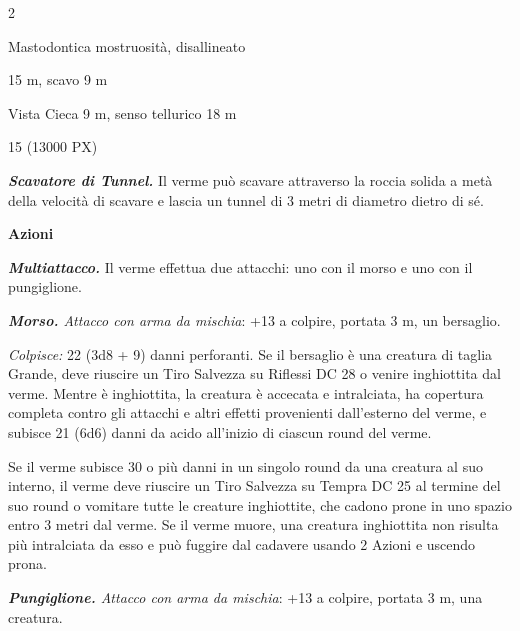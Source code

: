 \begin{multicols}{2}
{
\begin{description}[noitemsep, topsep=0pt, parsep=0pt, partopsep=0pt, itemsep=1pt, leftmargin=2.35cm,  labelwidth=2.2cm, itemindent=0cm, listparindent=0pt] %
\setlength{\baselineskip}{10pt}
\item[\textbf{Taglia/Tipo}] Mastodontica mostruosità, disallineato
\item[\textbf{Caratt.}] 
\item[\textbf{Punti Ferita}] 
\item[\textbf{Movimento}] 15 m, scavo 9 m
\item[\textbf{Tiri Salvez.}] 
\item[\textbf{Sensi}] Vista Cieca 9 m, senso tellurico 18 m
\item[\textbf{Sfida}] 15 (13000 PX)
\end{description}
\smallskip

\emph{\textbf{Scavatore di Tunnel.}} Il verme può scavare attraverso la roccia solida a metà della velocità di scavare e lascia un tunnel di 3 metri di diametro dietro di sé.

\textbf{Azioni}

\emph{\textbf{Multiattacco.}} Il verme effettua due attacchi: uno con il morso e uno con il pungiglione.

\emph{\textbf{Morso.} Attacco con arma da mischia}: +13 a colpire, portata 3 m, un bersaglio.

\emph{Colpisce:} 22 (3d8 + 9) danni perforanti. Se il bersaglio è una creatura di taglia Grande, deve riuscire un Tiro Salvezza su Riflessi DC 28 o venire inghiottita dal verme. Mentre è inghiottita, la creatura è accecata e intralciata, ha copertura completa contro gli attacchi e altri effetti provenienti dall'esterno del verme, e subisce 21 (6d6) danni da acido all'inizio di ciascun round del verme.

Se il verme subisce 30 o più danni in un singolo round da una creatura al suo interno, il verme deve riuscire un Tiro Salvezza su Tempra DC 25 al termine del suo round o vomitare tutte le creature inghiottite, che cadono prone in uno spazio entro 3 metri dal verme. Se il verme muore, una creatura inghiottita non risulta più intralciata da esso e può fuggire dal cadavere usando 2 Azioni e uscendo prona.

\emph{\textbf{Pungiglione.} Attacco con arma da mischia}: +13 a colpire, portata 3 m, una creatura.

}
\end{multicols}
